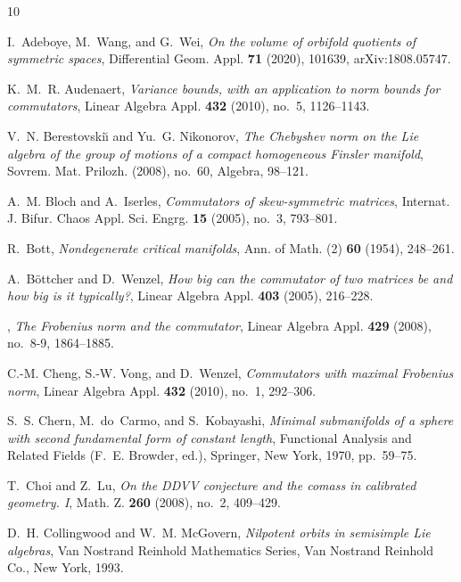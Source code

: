 \documentclass [leqno, 10pt]{amsart}
\theoremstyle{definition}
\numberwithin{equation}{section}
\begin{document}
\begin{thebibliography}{10}

I.~Adeboye, M.~Wang, and G.~Wei, \emph{On the volume of orbifold quotients of
  symmetric spaces}, Differential Geom. Appl. \textbf{71} (2020), 101639,
  arXiv:1808.05747.

K.~M.~R. Audenaert, \emph{Variance bounds, with an application to norm bounds
  for commutators}, Linear Algebra Appl. \textbf{432} (2010), no.~5,
  1126--1143.

V.~N. Berestovski{\u\i} and Yu.~G. Nikonorov, \emph{The {C}hebyshev norm on the
  {L}ie algebra of the group of motions of a compact homogeneous {F}insler
  manifold}, Sovrem. Mat. Prilozh. (2008), no.~60, Algebra, 98--121.

A.~M. Bloch and A.~Iserles, \emph{Commutators of skew-symmetric matrices},
  Internat. J. Bifur. Chaos Appl. Sci. Engrg. \textbf{15} (2005), no.~3,
  793--801.

R.~Bott, \emph{Nondegenerate critical manifolds}, Ann. of Math. (2) \textbf{60}
  (1954), 248--261.

A.~B{\"o}ttcher and D.~Wenzel, \emph{How big can the commutator of two matrices
  be and how big is it typically?}, Linear Algebra Appl. \textbf{403} (2005),
  216--228.

\bysame, \emph{The {F}robenius norm and the commutator}, Linear Algebra Appl.
  \textbf{429} (2008), no.~8-9, 1864--1885.

C.-M. Cheng, S.-W. Vong, and D.~Wenzel, \emph{Commutators with maximal
  {F}robenius norm}, Linear Algebra Appl. \textbf{432} (2010), no.~1, 292--306.

S.~S. Chern, M.~do~Carmo, and S.~Kobayashi, \emph{Minimal submanifolds of a
  sphere with second fundamental form of constant length}, Functional
  {A}nalysis and {R}elated {F}ields (F.~E. Browder, ed.), Springer, New York,
  1970, pp.~59--75.

T.~Choi and Z.~Lu, \emph{On the {DDVV} conjecture and the comass in calibrated
  geometry. {I}}, Math. Z. \textbf{260} (2008), no.~2, 409--429.

D.~H. Collingwood and W.~M. McGovern, \emph{Nilpotent orbits in semisimple
  {L}ie algebras}, Van Nostrand Reinhold Mathematics Series, Van Nostrand
  Reinhold Co., New York, 1993.


\end{thebibliography}
\end{document}
